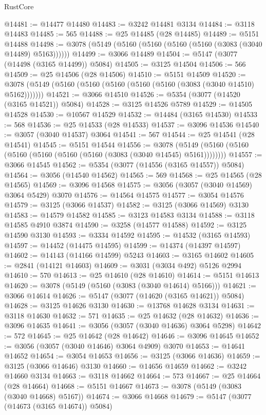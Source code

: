 \begin{lexlean}{RustCore}
\begin{coremodule}
@14481 := @14477 @14480
@14483 := @3242 @14481 @3134
@14484 := @3118 @14483
@14485 := 565
@14488 := @25 @14485 (@28 @14485)
@14489 := @5151 @14488
@14498 := @3078 (@5149 (@5160 (@5160 (@5160 (@5160 (@3083 (@3040 @14489) @5163))))))
@14499 := @3066 @14489
@14504 := @5147 (@3077 (@14498 (@3165 @14499)) @5084)
@14505 := @3125 @14504
@14506 := 566
@14509 := @25 @14506 (@28 @14506)
@14510 := @5151 @14509
@14520 := @3078 (@5149 (@5160 (@5160 (@5160 (@5160 (@5160 (@3083 (@3040 @14510) @5162)))))))
@14521 := @3066 @14510
@14526 := @5354 (@3077 (@14520 (@3165 @14521)) @5084)
@14528 := @3125 @14526 @5789
@14529 := @14505 @14528
@14530 := @10567 @14529
@14532 := @14484 (@3165 @14530)
@14533 := 568
@14536 := @25 @14533 (@28 @14533)
@14537 := @3096 @14536
@14540 := @3057 (@3040 @14537) @3064
@14541 := 567
@14544 := @25 @14541 (@28 @14541)
@14545 := @5151 @14544
@14556 := @3078 (@5149 (@5160 (@5160 (@5160 (@5160 (@5160 (@5160 (@3083 (@3040 @14545) @5161))))))))
@14557 := @3066 @14545
@14562 := @5354 (@3077 (@14556 (@3165 @14557)) @5084)
@14564 := @3056 (@14540 @14562)
@14565 := 569
@14568 := @25 @14565 (@28 @14565)
@14569 := @3096 @14568
@14575 := @3056 (@3057 (@3040 @14569) @3064 @5429) @3070
@14576 := @14564 @14575
@14577 := @3054 @14576
@14579 := @3125 (@3066 @14537)
@14582 := @3125 (@3066 @14569) @3130
@14583 := @14579 @14582
@14585 := @3123 @14583 @3134
@14588 := @3118 @14585 @4910 @3874
@14590 := @3258 (@14577 @14588)
@14592 := @3125 @14590 @3130
@14593 := @3334 @14592
@14595 := @14532 (@3165 @14593)
@14597 := @14452 (@14475 @14595)
@14599 := @14374 (@14397 @14597)
@14602 := @14143 (@14166 @14599) @5243
@14603 := @3165 @14602
@14605 := @2841 (@14121 @14603)
@14609 := @3031 (@3034 @492) @5126 @2994
@14610 := 570
@14613 := @25 @14610 (@28 @14610)
@14614 := @5151 @14613
@14620 := @3078 (@5149 (@5160 (@3083 (@3040 @14614) @5166)))
@14621 := @3066 @14614
@14626 := @5147 (@3077 (@14620 (@3165 @14621)) @5084)
@14628 := @3125 @14626 @3130
@14630 := @13768 @14628 @3134
@14631 := @3118 @14630
@14632 := 571
@14635 := @25 @14632 (@28 @14632)
@14636 := @3096 @14635
@14641 := @3056 (@3057 (@3040 @14636) @3064 @5298)
@14642 := 572
@14645 := @25 @14642 (@28 @14642)
@14646 := @3096 @14645
@14652 := @3056 (@3057 (@3040 @14646) @3064 @4909) @3070
@14653 := @14641 @14652
@14654 := @3054 @14653
@14656 := @3125 (@3066 @14636)
@14659 := @3125 (@3066 @14646) @3130
@14660 := @14656 @14659
@14662 := @3242 @14660 @3134
@14663 := @3118 @14662
@14664 := 573
@14667 := @25 @14664 (@28 @14664)
@14668 := @5151 @14667
@14673 := @3078 (@5149 (@3083 (@3040 @14668) @5167))
@14674 := @3066 @14668
@14679 := @5147 (@3077 (@14673 (@3165 @14674)) @5084)

\end{coremodule}
\end{lexlean}
